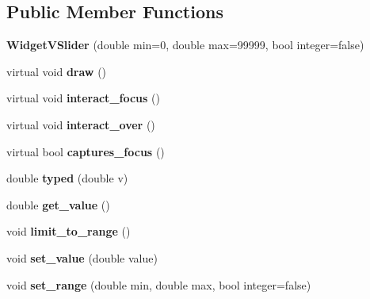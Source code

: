 \subsection*{Public Member Functions}
\begin{DoxyCompactItemize}
\item 
\mbox{\label{classgrman_1_1_widget_v_slider_a5c99012ba3a4c8df0764f6d9cdb04a04}} 
{\bfseries Widget\+V\+Slider} (double min=0, double max=99999, bool integer=false)
\item 
\mbox{\label{classgrman_1_1_widget_v_slider_abe01c8a374090127186600950deeea1c}} 
virtual void {\bfseries draw} ()
\item 
\mbox{\label{classgrman_1_1_widget_v_slider_a1045608d559b20463042553067b9eaa6}} 
virtual void {\bfseries interact\+\_\+focus} ()
\item 
\mbox{\label{classgrman_1_1_widget_v_slider_a31a7abe448a7a3f68e6fbc979af85aab}} 
virtual void {\bfseries interact\+\_\+over} ()
\item 
\mbox{\label{classgrman_1_1_widget_v_slider_aefa232ab9252005f1d3d6dc560b39762}} 
virtual bool {\bfseries captures\+\_\+focus} ()
\item 
\mbox{\label{classgrman_1_1_widget_v_slider_a2ff65cdbb07468558d5f1327dd3e3b15}} 
double {\bfseries typed} (double v)
\item 
\mbox{\label{classgrman_1_1_widget_v_slider_ae0462e56f0185a2841643f97a931206b}} 
double {\bfseries get\+\_\+value} ()
\item 
\mbox{\label{classgrman_1_1_widget_v_slider_a4fa09e37283a46fef876c96ccf09cb6e}} 
void {\bfseries limit\+\_\+to\+\_\+range} ()
\item 
\mbox{\label{classgrman_1_1_widget_v_slider_aeb7f889ce3cf0ca948fe79817b25181d}} 
void {\bfseries set\+\_\+value} (double value)
\item 
\mbox{\label{classgrman_1_1_widget_v_slider_a379482a4d66b8bedfc84f76cfd8bddb3}} 
void {\bfseries set\+\_\+range} (double min, double max, bool integer=false)
\end{DoxyCompactItemize}
